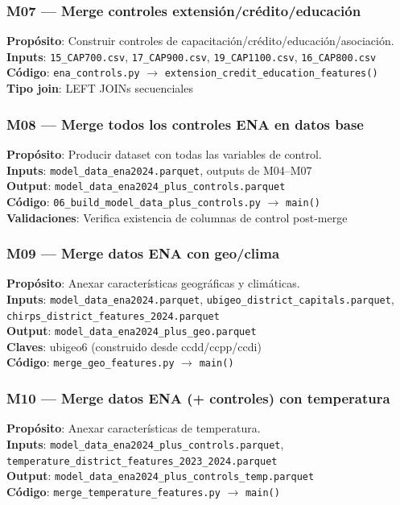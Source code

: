 \documentclass[11pt,a4paper]{article}
\begin{document}
\subsubsection{M07 — Merge controles extensión/crédito/educación}
\textbf{Propósito}: Construir controles de capacitación/crédito/educación/asociación.\\
\textbf{Inputs}: \texttt{15\_CAP700.csv}, \texttt{17\_CAP900.csv}, \texttt{19\_CAP1100.csv}, \texttt{16\_CAP800.csv}\\
\textbf{Código}: \texttt{ena\_controls.py} $\to$ \texttt{extension\_credit\_education\_features()}\\
\textbf{Tipo join}: LEFT JOINs secuenciales

\subsubsection{M08 — Merge todos los controles ENA en datos base}
\textbf{Propósito}: Producir dataset con todas las variables de control.\\
\textbf{Inputs}: \texttt{model\_data\_ena2024.parquet}, outputs de M04--M07\\
\textbf{Output}: \texttt{model\_data\_ena2024\_plus\_controls.parquet}\\
\textbf{Código}: \texttt{06\_build\_model\_data\_plus\_controls.py} $\to$ \texttt{main()}\\
\textbf{Validaciones}: Verifica existencia de columnas de control post-merge

\subsubsection{M09 — Merge datos ENA con geo/clima}
\textbf{Propósito}: Anexar características geográficas y climáticas.\\
\textbf{Inputs}: \texttt{model\_data\_ena2024.parquet}, \texttt{ubigeo\_district\_capitals.parquet}, \texttt{chirps\_district\_features\_2024.parquet}\\
\textbf{Output}: \texttt{model\_data\_ena2024\_plus\_geo.parquet}\\
\textbf{Claves}: ubigeo6 (construido desde ccdd/ccpp/ccdi)\\
\textbf{Código}: \texttt{merge\_geo\_features.py} $\to$ \texttt{main()}

\subsubsection{M10 — Merge datos ENA (+ controles) con temperatura}
\textbf{Propósito}: Anexar características de temperatura.\\
\textbf{Inputs}: \texttt{model\_data\_ena2024\_plus\_controls.parquet}, \texttt{temperature\_district\_features\_2023\_2024.parquet}\\
\textbf{Output}: \texttt{model\_data\_ena2024\_plus\_controls\_temp.parquet}\\
\textbf{Código}: \texttt{merge\_temperature\_features.py} $\to$ \texttt{main()}
\end{document}
